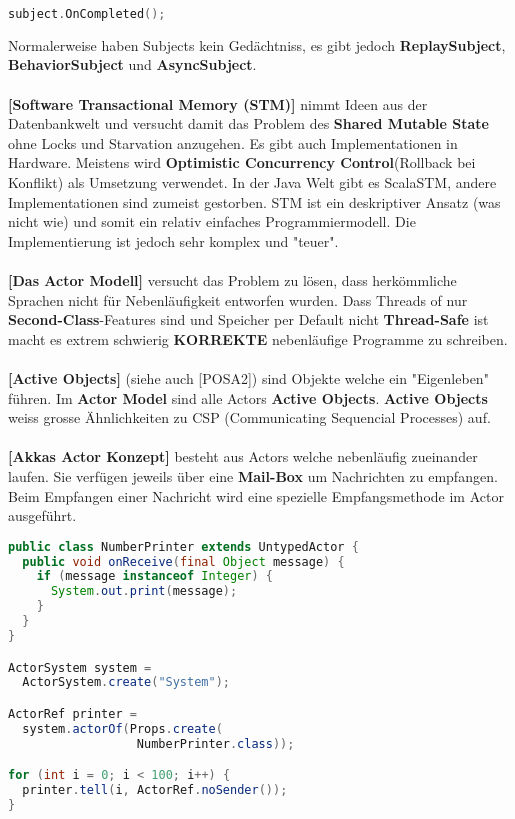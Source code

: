 \documentclass[8pt]{extarticle}
\let\oldtextbf\textbf
\renewcommand{\textbf}{\tiny\oldtextbf}
\begin{document}
\begin{multicols*}{5}
\begin{lstlisting}[language=c++]
subject.OnCompleted();
\end{lstlisting}
Normalerweise haben Subjects kein Gedächtniss, es gibt jedoch \textbf{ReplaySubject}, \textbf{BehaviorSubject} und \textbf{AsyncSubject}.\\\\
\textbf{[Software Transactional Memory (STM)]} nimmt Ideen aus der Datenbankwelt und versucht damit das Problem des \textbf{Shared Mutable State} ohne Locks und Starvation anzugehen. Es gibt auch Implementationen in Hardware. Meistens wird \textbf{Optimistic Concurrency Control}(Rollback bei Konflikt) als Umsetzung verwendet. In der Java Welt gibt es ScalaSTM, andere Implementationen sind zumeist gestorben. STM ist ein deskriptiver Ansatz (was nicht wie) und somit ein relativ einfaches Programmiermodell. Die Implementierung ist jedoch sehr komplex und "teuer".\\\\
\textbf{[Das Actor Modell]} versucht das Problem zu lösen, dass herkömmliche Sprachen nicht für Nebenläufigkeit entworfen wurden. Dass Threads of nur \textbf{Second-Class}-Features sind und Speicher per Default nicht \textbf{Thread-Safe} ist macht es extrem schwierig \textbf{KORREKTE} nebenläufige Programme zu schreiben.\\\\
\textbf{[Active Objects]} (siehe auch [POSA2]) sind Objekte welche ein "Eigenleben" führen. Im \textbf{Actor Model} sind alle Actors \textbf{Active Objects}. \textbf{Active Objects} weiss grosse Ähnlichkeiten zu CSP (Communicating Sequencial Processes) auf.\\\\
\textbf{[Akkas Actor Konzept]} besteht aus Actors welche nebenläufig zueinander laufen. Sie verfügen jeweils über eine \textbf{Mail-Box} um Nachrichten zu empfangen. Beim Empfangen einer Nachricht wird eine spezielle Empfangsmethode im Actor ausgeführt.
\begin{lstlisting}[language=java]
public class NumberPrinter extends UntypedActor {
  public void onReceive(final Object message) {
    if (message instanceof Integer) {
      System.out.print(message);
    }
  }
}

ActorSystem system =
  ActorSystem.create("System");

ActorRef printer =
  system.actorOf(Props.create(
                  NumberPrinter.class));

for (int i = 0; i < 100; i++) {
  printer.tell(i, ActorRef.noSender());
}


\end{lstlisting}
\end{multicols*}
\end{document}
